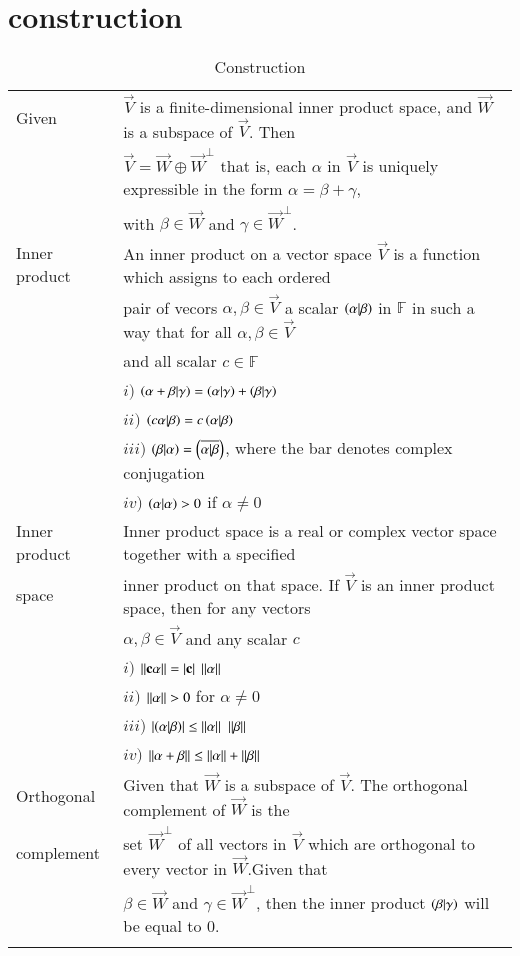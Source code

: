 \documentclass[journal,12pt]{IEEEtran}
\begin{document}
\section{construction}
\renewcommand{\thetable}{1}
\begin{longtable}{|l|l|}
    \hline
    Given&$\vec{V}$ is a finite-dimensional inner product space, and $\vec{W}$ is a subspace of $\vec{V}$. Then\\ &$\vec{V}=\vec{W}\oplus\vec{W}^\perp$
    that is, each $\alpha$ in $\vec{V}$ is uniquely expressible in the form $\alpha=\beta+\gamma$,\\
    &with $\beta\in\vec{W}$ and $\gamma\in\vec{W}^\perp$.\\
    \hline
    Inner product&An inner product on a vector space $\vec{V}$ is a function which assigns to each ordered\\
    &pair of vecors $\alpha,\beta\in\vec{V}$ a scalar $\left(\alpha\vert \beta\right)$ in $\mathbb{F}$ in such a way that for all $\alpha,\beta\in\vec{V}$\\
    & and all scalar $c\in\mathbb{F}$\\
    &\qquad \qquad $i)$ $\left(\alpha+\beta\vert\gamma\right)=\left(\alpha\vert\gamma\right)+\left(\beta\vert\gamma\right)$\\
    &\qquad \qquad $ii)$ $\left(c\alpha\vert\beta\right)=c\left(\alpha\vert\beta\right)$\\
    &\qquad \qquad $iii)$ $\left(\beta\vert\alpha\right)=\left(\overline{\alpha\vert\beta}\right)$, where the bar denotes complex conjugation\\
    &\qquad \qquad $iv)$ $\left(\alpha\vert\alpha\right)>0$ if $\alpha\neq 0$\\
    \hline
    Inner product&Inner product space is a real or complex vector space together with a specified\\
    space&inner product on that space. If $\vec{V}$ is an inner product space, then for any vectors \\
    &$\alpha,\beta\in\vec{V}$ and any scalar $c$\\
    &\qquad \qquad $i)$ $\mathbf{\left\lVert c\alpha\right\rVert}=\mathbf{\left\vert c\right\vert}$ $\mathbf{\left\lVert\alpha\right\rVert}$\\
    \hline
    &\qquad\qquad $ii)$ $\mathbf{\left\lVert\alpha\right\rVert}>0$ for $\alpha\neq 0$\\
    &\qquad\qquad$iii)$ $\mathbf{\left\vert\left(\alpha\vert\beta\right)\right\vert}\leq \mathbf{\left\lVert\alpha\right\rVert}$ $\mathbf{\left\lVert\beta\right\rVert}$\\
    &\qquad\qquad$iv)$ $\mathbf{\left\lVert\alpha+\beta\right\rVert}\leq \mathbf{\left\lVert\alpha\right\rVert}+\mathbf{\left\lVert\beta\right\rVert}$\\
    \hline
    Orthogonal&Given that $\vec{W}$ is a subspace of $\vec{V}$. The orthogonal complement of $\vec{W}$ is the \\
    complement & set $\vec{W}^\perp$ of all vectors in $\vec{V}$ which are orthogonal to every vector in $\vec{W}$.Given that\\
    & $\beta\in\vec{W}$ and $\gamma\in\vec{W}^\perp$, then the inner product $\left(\beta\vert\gamma\right)$ will be equal to $0$.\\
    \hline
    \caption{Construction}
    \label{tab:Cons}
\end{longtable}
\end{document}
